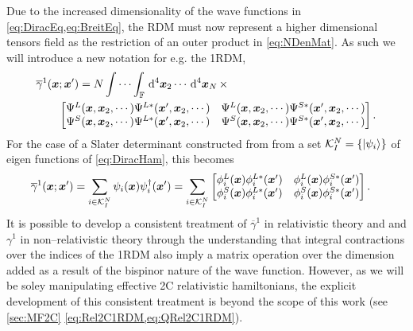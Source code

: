 Due to the increased dimensionality of the wave functions in \cref{eq:DiracEq,eq:BreitEq}, the RDM must now represent 
a higher dimensional tensors field as the restriction of an outer product in \cref{eq:NDenMat}. As such
we will introduce a new notation for e.g. the 1RDM,
\begin{align}
  \label{eq:Rel1RDM}
  &\overline{\gamma}^1(\boldsymbol{x}; \boldsymbol{x}') = 
    N \idotsint_\mathbb{F} \,\mathrm{d}^4\boldsymbol{x}_{2}\cdots\,\mathrm{d}^4\boldsymbol{x}_N \,\times \nonumber \\ &\qquad
    \begin{bmatrix} 
      \Psi^L(\boldsymbol{x},\boldsymbol{x}_2,\cdots) \Psi^{L*}(\boldsymbol{x}',\boldsymbol{x}_2,\cdots) &
      \Psi^L(\boldsymbol{x},\boldsymbol{x}_2,\cdots) \Psi^{S*}(\boldsymbol{x}',\boldsymbol{x}_2,\cdots) \\
      \Psi^S(\boldsymbol{x},\boldsymbol{x}_2,\cdots) \Psi^{L*}(\boldsymbol{x}',\boldsymbol{x}_2,\cdots) &
      \Psi^S(\boldsymbol{x},\boldsymbol{x}_2,\cdots) \Psi^{S*}(\boldsymbol{x}',\boldsymbol{x}_2,\cdots) 
    \end{bmatrix}. 
\end{align}
For the case of a Slater determinant constructed from from a set $\mathcal K_I^N = \{\left\vert \psi_i \right\rangle\}$ of eigen functions 
of \cref{eq:DiracHam}, this becomes
\begin{align}
  &\overline\gamma^1(\boldsymbol{x}; \boldsymbol{x}') = 
    \sum_{i \in \mathcal K^N_I} \psi_i(\boldsymbol{x}) \psi_i^\dagger(\boldsymbol{x}') = 
    \sum_{i \in \mathcal K^N_I} 
    \begin{bmatrix} 
      \phi_i^L(\boldsymbol{x}) \phi_i^{L*}(\boldsymbol{x}') &
      \phi_i^L(\boldsymbol{x}) \phi_i^{S*}(\boldsymbol{x}') \\
      \phi_i^S(\boldsymbol{x}) \phi_i^{L*}(\boldsymbol{x}') &
      \phi_i^S(\boldsymbol{x}) \phi_i^{S*}(\boldsymbol{x}') 
    \end{bmatrix}. 
\end{align}
It is possible to develop a consistent treatment of $\overline{\gamma}^1$ in relativistic theory and 
and $\gamma^1$ in non--relativistic theory
through the understanding that integral contractions over the indices of the 1RDM also imply a matrix operation
over the dimension added as a result of the bispinor nature of the wave function. However, as we will be soley
manipulating effective 2C relativistic hamiltonians, the explicit development of
this consistent treatment is beyond the scope of this work (see \cref{sec:MF2C} \cref{eq:Rel2C1RDM,eq:QRel2C1RDM}).


